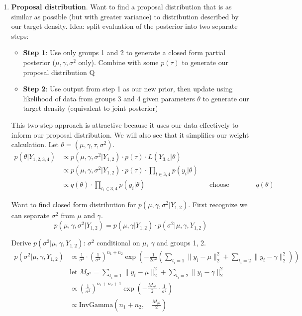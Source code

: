 \documentclass[12pt,letterpaper,twoside]{article}
\begin{document}
\begin{enumerate}[label=(\alph*)]
    \item \textbf{Proposal distribution}. Want to find a proposal distribution that is as similar 
    as possible (but with greater variance) to distribution described by our target density. 
    Idea: split evaluation of the posterior into two separate steps: 
    \begin{itemize}
        \item \textbf{Step 1}: Use only groups 1 and 2 to generate a closed form partial posterior ($\mu, \gamma, \sigma^2$ only). Combine with some $p(\tau)$ to generate our proposal distribution Q
        \item \textbf{Step 2}: Use output from step 1 as our new prior, then update using likelihood of data from groups 3 and 4 given parameters $\theta$ to generate our target density (equivalent to joint posterior) 
    \end{itemize}

    This two-step approach is attractive because it uses our data effectively to inform 
    our proposal distribution. We will also see that it simplifies our weight calculation. 
    Let $\theta = (\mu, \gamma, \tau, \sigma^2)$.
    \begin{align*}
        p(\theta|Y_{1,2,3,4}) & \propto p(\mu, \gamma, \sigma^2|Y_{1,2}) \cdot p(\tau) \cdot L(Y_{3,4}|\theta) \\
            & \propto p(\mu, \gamma, \sigma^2|Y_{1,2}) \cdot p(\tau) \cdot \prod_{t\in{3,4}} p(y_i|\theta) \\
            & \propto q(\theta) \cdot \prod_{t_i\in{3,4}} p(y_i|\theta) && \text{choose proposal $q(\theta)$}
    \end{align*}

    Want to find closed form distribution for $p(\mu, \gamma, \sigma^2|Y_{1,2})$. 
    First recognize we can separate $\sigma^2$ from $\mu$ and $\gamma$.
    $$ p(\mu, \gamma, \sigma^2|Y_{1,2}) = p(\mu, \gamma|Y_{1,2}) \cdot p(\sigma^2|\mu, \gamma, Y_{1,2}) $$
    
    Derive $p(\sigma^2|\mu, \gamma, Y_{1,2})$: $\sigma^2$ conditional on $\mu$, $\gamma$ and groups 1, 2.
    \begin{align*}
        p(\sigma^2|\mu, \gamma, Y_{1,2}) & \propto \frac{1}{\sigma^2} \cdot \left(\frac{1}{\sigma^2}\right)^{n_1 + n_2} \exp\left(-\frac{1}{2\sigma^2}(\sum_{t_i=1} \|y_i-\mu\|^2_2 + \sum_{t_i=2} \|y_i-\gamma\|^2_2)\right) \\
            & \text{let $M_{\sigma^2}=\sum_{t_i=1} \|y_i-\mu\|^2_2 + \sum_{t_i=2} \|y_i-\gamma\|^2_2$} \\
            & \propto \left(\frac{1}{\sigma^2}\right)^{n_1 + n_2 + 1} \exp\left(-\frac{M_{\sigma^2}}{2} \cdot \frac{1}{\sigma^2}\right) \\
            & \propto \text{InvGamma}\left(n_1+n_2, \quad \frac{M_{\sigma^2}}{2} \right)
    \end{align*}


\end{enumerate}
\end{document}
